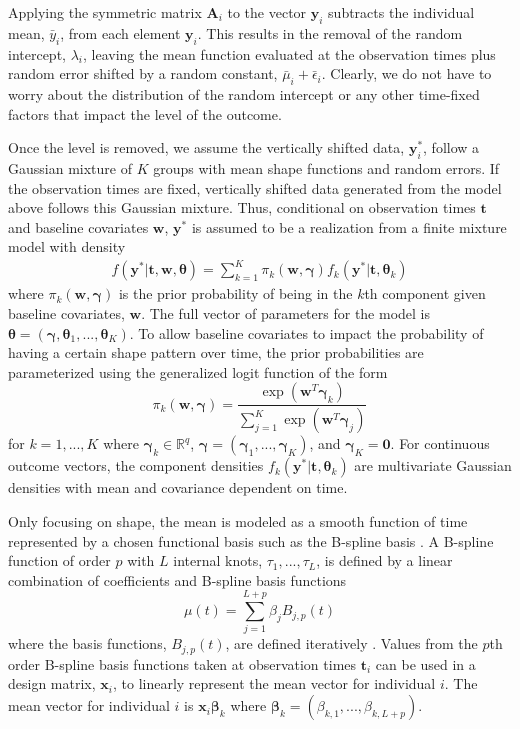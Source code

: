 \documentclass[12pt]{article}
\newcommand{\B}[0]{\mathbf}
\newcommand{\BS}[0]{\boldsymbol}
\begin{document}
Applying the symmetric matrix $\B A_{i}$ to the vector $\B y_{i}$ subtracts the individual mean, $\bar{y}_{i}$, from each element $\B y_{i}$. This results in the removal of the random intercept, $\lambda_{i}$, leaving the mean function evaluated at the observation times plus random error shifted by a random constant, $\bar{\mu}_{i}+\bar{\epsilon}_{i}$. Clearly, we do not have to worry about the distribution of the random intercept or any other time-fixed factors that impact the level of the outcome. 

Once the level is removed, we assume the vertically shifted data, $\B y_{i}^{*}$, follow a Gaussian mixture of $K$ groups with mean shape functions and random errors. If the observation times are fixed, vertically shifted data generated from the model above follows this Gaussian mixture. Thus, conditional on observation times $\B t$ and baseline covariates $\B w$, $\B y^{*}$ is assumed to be a realization from a finite mixture model with density
\begin{align*}
 f(\B y^{*}|\B t,\B w,\BS\theta) =  \sum^{K}_{k=1}\pi_{k}(\B w,\BS \gamma)f_{k}( \B y^{*}|\B t,\BS\theta_{k})
\end{align*}
where $\pi_{k}(\B w,\BS \gamma)$ is the prior probability of being in the $k$th component given baseline covariates, $\B w$. The full vector of parameters for the model is $\BS\theta = (\BS\gamma,\BS\theta_{1},...,\BS\theta_{K})$. To allow baseline covariates to impact the probability of having a certain shape pattern over time, the prior probabilities are parameterized using the generalized logit function of the form
$$\pi_{k}(\B w,\BS\gamma)=\frac{\exp(\B w^{T}\BS\gamma_{k})}{\sum_{j=1}^{K}\exp(\B w^{T}\BS\gamma_{j})}$$ 
for $k=1,...,K$ where $\BS \gamma_{k}\in\mathbb{R}^{q}$, $\BS\gamma = (\BS\gamma_{1},...,\BS\gamma_{K})$, and $\BS\gamma_{K}=\B 0$. For continuous outcome vectors, the component densities $f_{k}(\B y^{*}|\B t,\BS\theta_{k})$ are multivariate Gaussian densities with mean and covariance dependent on time. 

Only focusing on shape, the mean is modeled as a smooth function of time represented by a chosen functional basis such as the B-spline basis \cite{deboor1978, schumaker1981,curry1966, de1976}. A B-spline function of order $p$ with $L$ internal knots, $\tau_{1},...,\tau_{L}$, is defined by a linear combination of coefficients and B-spline basis functions
$$\mu(t) = \sum^{L+p}_{j=1} \beta_j B_{j,p}(t)$$
where the basis functions, $B_{j,p}(t)$, are defined iteratively \cite{deboor1972,cox1972}. Values from the $p$th order B-spline basis functions taken at observation times $\B t_{i}$ can be used in a design matrix, $\B x_{i}$, to linearly represent the mean vector for individual $i$. The mean vector for individual $i$ is $\B x_{i}\BS\beta_{k}$ where $\BS\beta_{k}=(\beta_{k,1},...,\beta_{k, L+p}).$  
\end{document}

